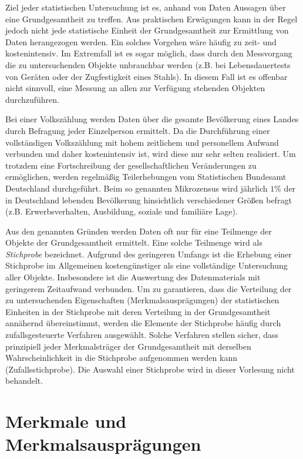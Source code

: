 \documentclass{lecture}
\begin{document}
    Ziel jeder statistischen Untersuchung ist es, anhand von Daten Aussagen über eine Grundgesamtheit zu treffen.
    Aus praktischen Erwägungen kann in der Regel jedoch nicht jede statistische Einheit der Grundgesamtheit zur Ermittlung von Daten herangezogen werden.
    Ein solches Vorgehen wäre häufig zu zeit- und kostenintensiv.
    Im Extremfall ist es sogar möglich, dass durch den Messvorgang die zu untersuchenden Objekte unbrauchbar werden (z.B. bei Lebensdauertests von Geräten oder der Zugfestigkeit eines Stahls).
    In diesem Fall ist es offenbar nicht sinnvoll, eine Messung an allen zur Verfügung stehenden Objekten durchzuführen.
    \begin{example}
        Bei einer Volkszählung werden Daten über die gesamte Bevölkerung eines Landes durch Befragung jeder Einzelperson ermittelt.
        Da die Durchführung einer vollständigen Volkszählung mit hohem zeitlichem und personellem Aufwand verbunden und daher kostenintensiv ist, wird diese nur sehr selten realisiert.
        Um trotzdem eine Fortschreibung der gesellschaftlichen Veränderungen zu ermöglichen, werden regelmäßig Teilerhebungen vom Statistischen Bundesamt Deutschland durchgeführt.
        Beim so genannten Mikrozensus wird jährlich \(1\%\) der in Deutschland lebenden Bevölkerung hinsichtlich verschiedener Größen befragt (z.B. Erwerbsverhalten, Ausbildung, soziale und familiäre Lage).
    \end{example}
    Aus den genannten Gründen werden Daten oft nur für eine Teilmenge der Objekte der Grundgesamtheit ermittelt.
    Eine solche Teilmenge wird als \emph{Stichprobe} bezeichnet.
    Aufgrund des geringeren Umfangs ist die Erhebung einer Stichprobe im Allgemeinen kostengünstiger als eine vollständige Untersuchung aller Objekte.
    Insbesondere ist die Auswertung des Datenmaterials mit geringerem Zeitaufwand verbunden.
    Um zu garantieren, dass die Verteilung der zu untersuchenden Eigenschaften (Merkmalsausprägungen) der statistischen Einheiten in der Stichprobe mit deren Verteilung in der Grundgesamtheit annähernd übereinstimmt, werden die Elemente der Stichprobe häufig durch zufallsgesteuerte Verfahren ausgewählt.
    Solche Verfahren stellen sicher, dass prinzipiell jeder Merkmalsträger der Grundgesamtheit mit derselben Wahrscheinlichkeit in die Stichprobe aufgenommen werden kann (Zufallsstichprobe).
    Die Auswahl einer Stichprobe wird in dieser Vorlesung nicht behandelt.


    \section*{Merkmale und Merkmalsausprägungen}
\end{document}
